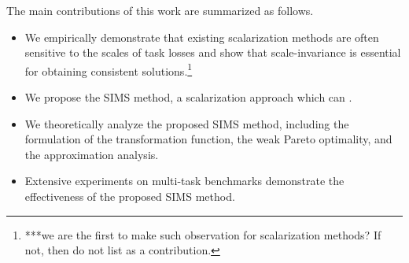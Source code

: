 \documentclass[sigconf]{acmart}
\begin{document}
The main contributions of this work are summarized as follows.
\begin{itemize}
\item We empirically demonstrate that existing scalarization methods are often sensitive to the scales of task losses and show that scale-invariance is essential for obtaining consistent solutions.\footnote{***we are the first to make such observation for scalarization methods? If not, then do not list as a contribution. }
\item We propose the SIMS method, a scalarization approach which can .%
\item We theoretically analyze the proposed SIMS method, including the formulation of the transformation function, the weak Pareto optimality, and the approximation analysis.%
\item Extensive experiments on multi-task benchmarks demonstrate the effectiveness of the proposed SIMS method.%
\end{itemize}
\end{document}
